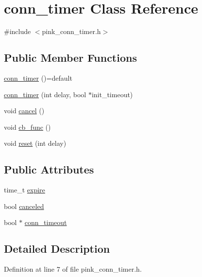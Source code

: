 \hypertarget{classconn__timer}{}\section{conn\+\_\+timer Class Reference}
\label{classconn__timer}


{\ttfamily \#include $<$pink\+\_\+conn\+\_\+timer.\+h$>$}

\subsection*{Public Member Functions}
\begin{DoxyCompactItemize}
\item 
\hyperlink{classconn__timer_a0779436b23e1b67636349fb7c08cdf45}{conn\+\_\+timer} ()=default
\item 
\hyperlink{classconn__timer_a1f4ceab01f4274ab66147f4bb9fec535}{conn\+\_\+timer} (int delay, bool $\ast$init\+\_\+timeout)
\item 
void \hyperlink{classconn__timer_a543102358beb1bc590006310556182de}{cancel} ()
\item 
void \hyperlink{classconn__timer_a86d7a0d33b7423368bba281a0d0eaab9}{cb\+\_\+func} ()
\item 
void \hyperlink{classconn__timer_a6cb5ef510c4022acd31b002e15758d60}{reset} (int delay)
\end{DoxyCompactItemize}
\subsection*{Public Attributes}
\begin{DoxyCompactItemize}
\item 
time\+\_\+t \hyperlink{classconn__timer_a2c71b17e51d75dc27a4e0f1f7e443ec5}{expire}
\item 
bool \hyperlink{classconn__timer_a51dd2abd61d07bd63c37551404851bf5}{canceled}
\item 
bool $\ast$ \hyperlink{classconn__timer_a0f3fbb63bdf0764fffe4b5fd0fedc3db}{conn\+\_\+timeout}
\end{DoxyCompactItemize}


\subsection{Detailed Description}


Definition at line 7 of file pink\+\_\+conn\+\_\+timer.\+h.



